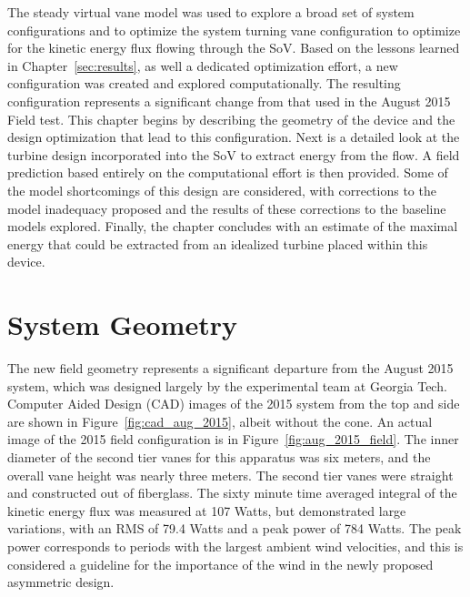 \label{sec:field}

The steady virtual vane model was used to explore a broad set of
system configurations and to optimize the system turning vane
configuration to optimize for the kinetic energy flux flowing through
the SoV. Based on the lessons learned in Chapter~\ref{sec:results}, as
well a dedicated optimization effort, a new configuration was created
and explored computationally. The resulting configuration represents a
significant change from that used in the August 2015 Field test. This
chapter begins by describing the geometry of the device and the design
optimization that lead to this configuration. Next is a detailed look
at the turbine design incorporated into the SoV to extract energy from
the flow. A field prediction based entirely on the computational effort is
then provided. Some of the model shortcomings of this design are
considered, with corrections to the model inadequacy proposed and the
results of these corrections to the baseline models explored. Finally,
the chapter concludes with an estimate of the maximal energy that could
be extracted from an idealized turbine placed within this device.   

\section{System Geometry}

The new field geometry represents a significant departure from
the August 2015 system, which was designed largely by the experimental
team at Georgia Tech. Computer Aided Design (CAD) images of the 2015
system from the top and side are shown in Figure~\ref{fig:cad_aug_2015},
albeit without the cone. An actual image of the 2015 field configuration
is in Figure~\ref{fig:aug_2015_field}. The inner diameter of the second
tier vanes for this apparatus was six meters, and the overall vane
height was nearly three meters. The second tier vanes were straight and
constructed out of fiberglass. The sixty minute time averaged integral
of the kinetic energy flux was measured at 107 Watts, but demonstrated
large variations, with an RMS of 79.4 Watts and a peak power of 784
Watts. The peak power corresponds to periods with the largest ambient
wind velocities, and this is considered a guideline for the 
importance of the wind in the newly proposed asymmetric design.  

%
%
% 



